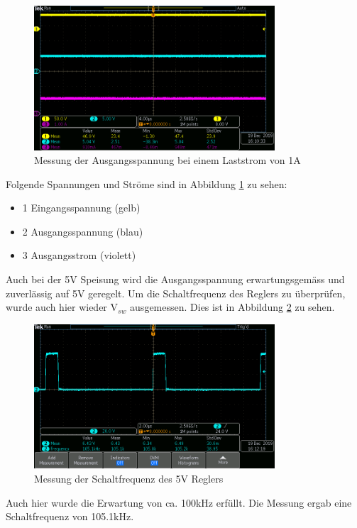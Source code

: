 \begin{figure}[h!]
	\centering
	\includegraphics[width=0.8\textwidth]{graphics/Eingang_Ausgang_Strom_5V.png}
	\caption{Messung der Ausgangsspannung bei einem Laststrom von 1A} 
	\label{fig:Eingang_Ausgang_Strom_5V}
\end{figure}
\newpage
Folgende Spannungen und Ströme sind in Abbildung \ref{fig:Eingang_Ausgang_Strom_5V} zu sehen: 

\begin{itemize}
	\item 1 Eingangsspannung (gelb)
	\item 2 Ausgangsspannung (blau)
	\item 3 Ausgangsstrom (violett)
\end{itemize}

Auch bei der 5V Speisung wird die Ausgangsspannung erwartungsgemäss und zuverlässig auf 5V geregelt. Um die Schaltfrequenz des Reglers zu überprüfen, wurde auch hier wieder V$_{sw}$ ausgemessen. Dies ist in Abbildung \ref{fig:Taktfrequenz_5V} zu sehen.

\begin{figure}[h!]
	\centering
	\includegraphics[width=0.8\textwidth]{graphics/Schaltfrequenz_SW_5V.png}
	\caption{Messung der Schaltfrequenz des 5V Reglers} 
	\label{fig:Taktfrequenz_5V}
\end{figure}

Auch hier wurde die Erwartung von ca. 100kHz erfüllt. Die Messung ergab eine Schaltfrequenz von 105.1kHz.